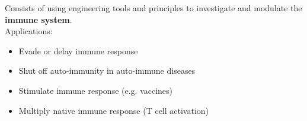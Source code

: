 Consists of using
engineering tools and principles to investigate
and modulate the \textbf{immune system}.\\

Applications:
\begin{itemize}
    \item Evade or delay immune response
    \item Shut off auto-immunity in auto-immune diseases
    \item Stimulate immune response (e.g. vaccines)
    \item Multiply native immune response (T cell activation)
\end{itemize}